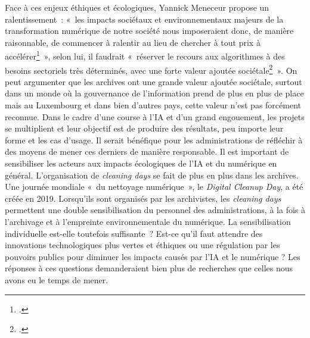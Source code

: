 	Face à ces enjeux éthiques et écologiques, Yannick Meneceur propose un
	ralentissement~: «~les impacts sociétaux et environnementaux majeurs de
	la transformation numérique de notre société nous imposeraient donc, de
	manière raisonnable, de commencer à ralentir au lieu de chercher à tout
	prix à accélérer\footcite{meneceur_trois_2021}~»,
	selon lui, il faudrait «~réserver le recours aux algorithmes à des
	besoins sectoriels très déterminés, avec une forte valeur ajoutée
	sociétale\footcite{meneceur_trois_2021}~».
	On peut argumenter que les archives ont une grande valeur ajoutée
	sociétale, surtout dans un monde où la gouvernance de l'information
	prend de plus en plus de place mais au Luxembourg 
	et dans bien d'autres pays, cette valeur n'est
	pas forcément reconnue. Dans le cadre d'une course à l'IA et
	d'un grand engouement, les projets se multiplient et leur objectif
	est de produire des résultats, peu importe leur forme et les cas
	d'usage. Il serait bénéfique pour les administrations de réfléchir à des
	moyens de mener ces derniers de manière responsable. Il est important de
	sensibiliser les acteurs aux impacts écologiques de l'IA et du
	numérique en général. L'organisation de \emph{cleaning days} se fait de
	plus en plus dans les archives. Une journée mondiale «~du nettoyage
	numérique~»,
	le \emph{Digital Cleanup Day}, a été créée en 2019. Lorsqu'ils sont organisés
	par les archivistes, les \emph{cleaning days} permettent une double
	sensibilisation du personnel des administrations, à la fois à
	l'archivage et à l'empreinte environnementale du numérique. La
	sensibilisation individuelle est-elle toutefois suffisante~? Est-ce
	qu'il faut attendre des innovations technologiques plus vertes et éthiques ou une régulation par
	les pouvoirs publics pour diminuer les impacts causés par l'IA et le
	numérique ? Les réponses à ces questions demanderaient bien plus de
	recherches que celles nous avons eu le temps de mener.
	
